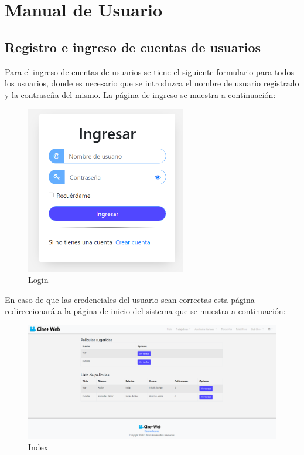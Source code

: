 \appendix
\chapter{Manual de Usuario}
\section{Registro e ingreso de cuentas de usuarios}

Para el ingreso de cuentas de usuarios  se tiene el siguiente formulario para todos los usuarios, donde es necesario que se introduzca el nombre de usuario registrado y la contraseña del mismo. La página de ingreso se muestra a continuación:\\

\begin{figure}[h!]
	\centering
	\includegraphics[width=7cm]{./chapters/img/login.png}
	
	\label{fig:login}
	\caption{Login}
\end{figure}

En caso de que las credenciales del usuario sean correctas esta página redireccionará a la página de inicio del sistema que se muestra a continuación:\\

\begin{figure}[h!]
	\centering
	\includegraphics[scale=0.4]{./chapters/img/Index.png}
	
	\label{fig:Index}
	\caption{Index}
\end{figure}
\newpage

